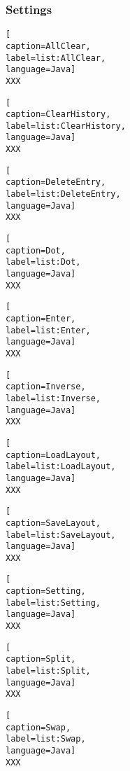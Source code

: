 \subsubsection{Settings}

\begin{lstlisting}[
caption=AllClear,
label=list:AllClear,
language=Java]
XXX
\end{lstlisting}    

\begin{lstlisting}[
caption=ClearHistory,
label=list:ClearHistory,
language=Java]
XXX
\end{lstlisting}    

\begin{lstlisting}[
caption=DeleteEntry,
label=list:DeleteEntry,
language=Java]
XXX
\end{lstlisting}    

\begin{lstlisting}[
caption=Dot,
label=list:Dot,
language=Java]
XXX
\end{lstlisting}    

\begin{lstlisting}[
caption=Enter,
label=list:Enter,
language=Java]
XXX
\end{lstlisting}    

\begin{lstlisting}[
caption=Inverse,
label=list:Inverse,
language=Java]
XXX
\end{lstlisting}    

\begin{lstlisting}[
caption=LoadLayout,
label=list:LoadLayout,
language=Java]
XXX
\end{lstlisting}    

\begin{lstlisting}[
caption=SaveLayout,
label=list:SaveLayout,
language=Java]
XXX
\end{lstlisting}    

\begin{lstlisting}[
caption=Setting,
label=list:Setting,
language=Java]
XXX
\end{lstlisting}    

\begin{lstlisting}[
caption=Split,
label=list:Split,
language=Java]
XXX
\end{lstlisting}    

\begin{lstlisting}[
caption=Swap,
label=list:Swap,
language=Java]
XXX
\end{lstlisting}    

